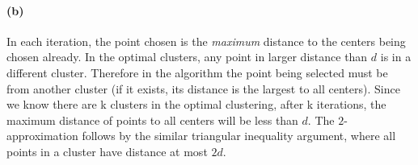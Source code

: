 \documentclass[12pt]{article}
\begin{document}
\paragraph{(b)} In each iteration, the point chosen is the \emph{maximum} distance to the centers being chosen already. In the optimal clusters, any point in larger distance than $d$ is in a different cluster. Therefore in the algorithm the point being selected must be from another cluster (if it exists, its distance is the largest to all centers). Since we know there are k clusters in the optimal clustering, after k iterations, the maximum distance of points to all centers will be less than $d$. The $2$-approximation follows by the similar triangular inequality argument, where all points in a cluster have distance at most $2d$. 
\end{document}
